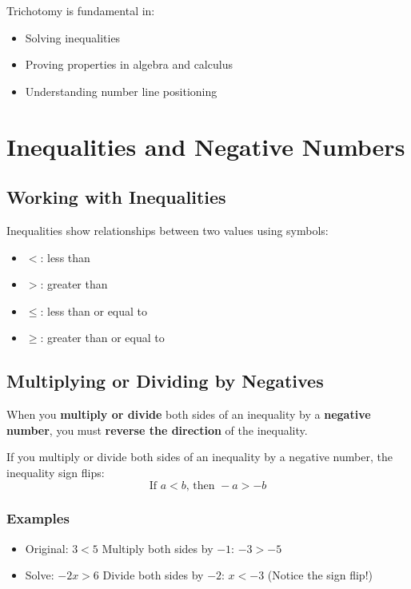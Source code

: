 \documentclass[11pt]{article}
\begin{document}
Trichotomy is fundamental in:
\begin{itemize}
  \item Solving inequalities
  \item Proving properties in algebra and calculus
  \item Understanding number line positioning
\end{itemize}

\section*{Inequalities and Negative Numbers}

\subsection{Working with Inequalities}

Inequalities show relationships between two values using symbols:

\begin{itemize}
  \item \( < \): less than
  \item \( > \): greater than
  \item \( \leq \): less than or equal to
  \item \( \geq \): greater than or equal to
\end{itemize}

\subsection{Multiplying or Dividing by Negatives}

When you \textbf{multiply or divide} both sides of an inequality by a \textbf{negative number}, you must \textbf{reverse the direction} of the inequality.

\begin{tcolorbox}[colback=orange!5!white, colframe=orange!80!black, title=Important Rule]
If you multiply or divide both sides of an inequality by a negative number, the inequality sign flips:
\[
\text{If } a < b \text{, then } -a > -b
\]
\end{tcolorbox}

\subsubsection*{Examples}

\begin{itemize}
  \item Original: \( 3 < 5 \)
    Multiply both sides by \( -1 \):
    \( -3 > -5 \)
  \item Solve: \( -2x > 6 \)
    Divide both sides by \( -2 \):
    \( x < -3 \) (Notice the sign flip!)
\end{itemize}
\end{document}
